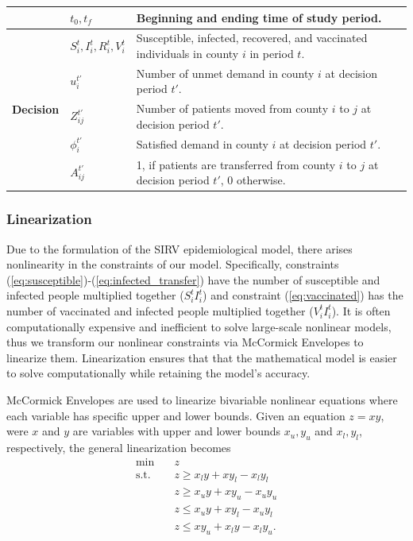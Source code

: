 \documentclass{article}
\begin{document}
\begin{table}[h]
\begin{tabular}{|p{}|p{}|p{}|}
        & $t_0, t_f$ & Beginning and ending time of study period. \\
        \hline
        \multirow{5}{*}{\textbf{Decision}}
        \multirow{5}{*}{\textbf{Variables}} 
        & $S_i^t, I_i^t, R_i^t, V_i^t$ & Susceptible, infected, recovered, and vaccinated individuals in county $i$ in period $t$. \\
        & $u_i^{t'}$ & Number of unmet demand in county $i$ at decision period $t'$. \\
        & $Z_{ij}^{t'}$ & Number of patients moved from county $i$ to $j$ at decision period $t'$. \\
        & $\phi_i^{t'}$ & Satisfied demand in county $i$ at decision period $t'$. \\
        & $A_{ij}^{t'}$ & 1, if patients are transferred from county $i$ to $j$ at decision period $t'$, 0 otherwise. \\
        \hline
    \end{tabular}
\end{table}

\subsubsection{Linearization}
Due to the formulation of the SIRV epidemiological model, there arises nonlinearity in the constraints of our model. Specifically, constraints (\ref{eq:susceptible})-(\ref{eq:infected_transfer}) have the number of susceptible and infected people multiplied together ($S_i^t I_i^t$) and constraint (\ref{eq:vaccinated}) has the number of vaccinated and infected people multiplied together ($V_i^t I_i^t$). It is often computationally expensive and inefficient to solve large-scale nonlinear models, thus we transform our nonlinear constraints via McCormick Envelopes \cite{mccormick1976computability} to linearize them. Linearization ensures that that the mathematical model is easier to solve computationally while retaining the model's accuracy.

McCormick Envelopes are used to linearize bivariable nonlinear equations where each variable has specific upper and lower bounds. Given an equation $ z = xy $, were $x$ and $y$ are variables with upper and lower bounds $ x_u, y_u$ and $x_l, y_l$, respectively, the general linearization becomes 
\[
    \begin{aligned}
        \min \quad & z \\
        \text{s.t.} \quad 
        &z \geq x_l y + x y_l - x_l y_l \\
        &z \geq x_u y + x y_u - x_u y_u \\
        &z \leq x_u y + x y_l - x_u y_l \\
        &z \leq x y_u + x_l y - x_l y_u.
    \end{aligned}
\]
\end{document}
